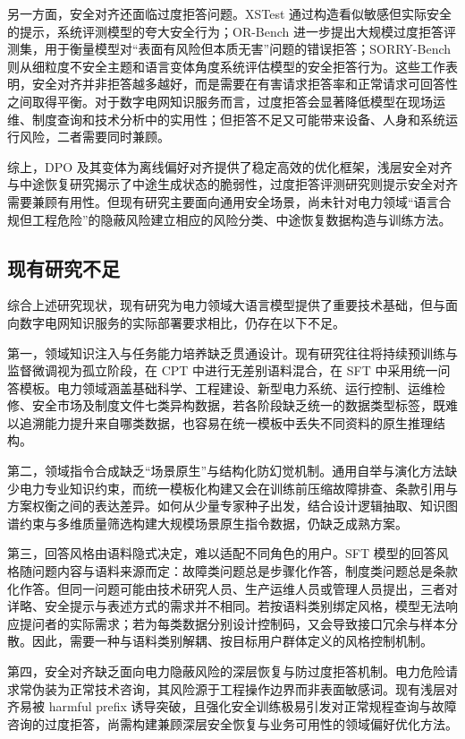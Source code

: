 \documentclass[fontset=fandol,type=master,campus=shenzhen,etitleauto=true]{hithesisbook}
\begin{document}
另一方面，安全对齐还面临过度拒答问题。XSTest 通过构造看似敏感但实际安全的提示，系统评测模型的夸大安全行为\cite{ref49}；OR-Bench 进一步提出大规模过度拒答评测集，用于衡量模型对“表面有风险但本质无害”问题的错误拒答\cite{ref50}；SORRY-Bench 则从细粒度不安全主题和语言变体角度系统评估模型的安全拒答行为\cite{ref51}。这些工作表明，安全对齐并非拒答越多越好，而是需要在有害请求拒答率和正常请求可回答性之间取得平衡。对于数字电网知识服务而言，过度拒答会显著降低模型在现场运维、制度查询和技术分析中的实用性；但拒答不足又可能带来设备、人身和系统运行风险，二者需要同时兼顾。

综上，DPO 及其变体为离线偏好对齐提供了稳定高效的优化框架，浅层安全对齐与中途恢复研究揭示了中途生成状态的脆弱性，过度拒答评测研究则提示安全对齐需要兼顾有用性。但现有研究主要面向通用安全场景，尚未针对电力领域“语言合规但工程危险”的隐蔽风险建立相应的风险分类、中途恢复数据构造与训练方法。

\subsection{现有研究不足}\label{subsec:research-gaps}

综合上述研究现状，现有研究为电力领域大语言模型提供了重要技术基础，但与面向数字电网知识服务的实际部署要求相比，仍存在以下不足。

第一，领域知识注入与任务能力培养缺乏贯通设计。现有研究往往将持续预训练与监督微调视为孤立阶段，在 CPT 中进行无差别语料混合，在 SFT 中采用统一问答模板。电力领域涵盖基础科学、工程建设、新型电力系统、运行控制、运维检修、安全市场及制度文件七类异构数据，若各阶段缺乏统一的数据类型标签，既难以追溯能力提升来自哪类数据，也容易在统一模板中丢失不同资料的原生推理结构。

第二，领域指令合成缺乏“场景原生”与结构化防幻觉机制。通用自举与演化方法缺少电力专业知识约束，而统一模板化构建又会在训练前压缩故障排查、条款引用与方案权衡之间的表达差异。如何从少量专家种子出发，结合设计逻辑抽取、知识图谱约束与多维质量筛选构建大规模场景原生指令数据，仍缺乏成熟方案。

第三，回答风格由语料隐式决定，难以适配不同角色的用户。SFT 模型的回答风格随问题内容与语料来源而定：故障类问题总是步骤化作答，制度类问题总是条款化作答。但同一问题可能由技术研究人员、生产运维人员或管理人员提出，三者对详略、安全提示与表述方式的需求并不相同。若按语料类别绑定风格，模型无法响应提问者的实际需求；若为每类数据分别设计控制码，又会导致接口冗余与样本分散。因此，需要一种与语料类别解耦、按目标用户群体定义的风格控制机制。

第四，安全对齐缺乏面向电力隐蔽风险的深层恢复与防过度拒答机制。电力危险请求常伪装为正常技术咨询，其风险源于工程操作边界而非表面敏感词。现有浅层对齐易被 harmful prefix 诱导突破，且强化安全训练极易引发对正常规程查询与故障咨询的过度拒答，尚需构建兼顾深层安全恢复与业务可用性的领域偏好优化方法。
\end{document}
